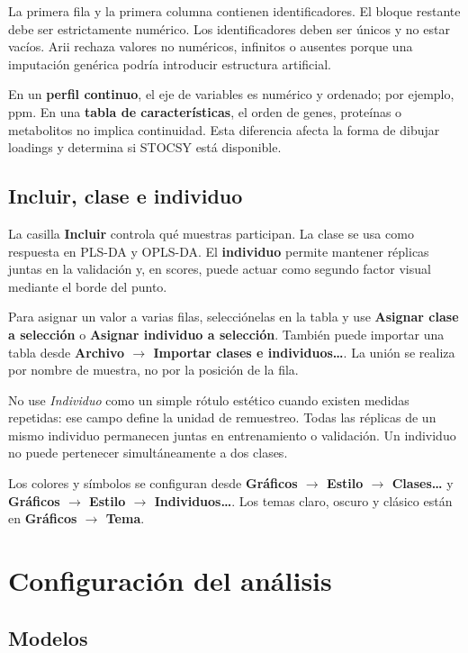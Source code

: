 \documentclass[11pt,a4paper,openany]{report}
\newcommand{\menu}[1]{\textbf{#1}}
\begin{document}
La primera fila y la primera columna contienen identificadores. El bloque
restante debe ser estrictamente numérico. Los identificadores deben ser únicos y
no estar vacíos. Arii rechaza valores no numéricos, infinitos o ausentes porque
una imputación genérica podría introducir estructura artificial.

En un \textbf{perfil continuo}, el eje de variables es numérico y ordenado; por
ejemplo, ppm. En una \textbf{tabla de características}, el orden de genes,
proteínas o metabolitos no implica continuidad. Esta diferencia afecta la forma
de dibujar loadings y determina si STOCSY está disponible.

\section{Incluir, clase e individuo}

La casilla \menu{Incluir} controla qué muestras participan. La clase se usa como
respuesta en PLS-DA y OPLS-DA. El \menu{individuo} permite mantener réplicas juntas en la validación y, en scores, puede actuar como segundo factor visual mediante el borde del punto.

Para asignar un valor a varias filas, selecciónelas en la tabla y use
\menu{Asignar clase a selección} o \menu{Asignar individuo a selección}. También
puede importar una tabla desde
\menu{Archivo \texorpdfstring{$\rightarrow$}{ > } Importar clases e individuos…}.
La unión se realiza por nombre de muestra, no por la posición de la fila.

No use \emph{Individuo} como un simple rótulo estético cuando existen medidas
repetidas: ese campo define la unidad de remuestreo. Todas las réplicas de un
mismo individuo permanecen juntas en entrenamiento o validación. Un individuo
no puede pertenecer simultáneamente a dos clases.

Los colores y símbolos se configuran desde
\menu{Gráficos \texorpdfstring{$\rightarrow$}{ > } Estilo
\texorpdfstring{$\rightarrow$}{ > } Clases…} y
\menu{Gráficos \texorpdfstring{$\rightarrow$}{ > } Estilo
\texorpdfstring{$\rightarrow$}{ > } Individuos…}. Los temas claro, oscuro y
clásico están en
\menu{Gráficos \texorpdfstring{$\rightarrow$}{ > } Tema}.

\chapter{Configuración del análisis}

\section{Modelos}
\end{document}
